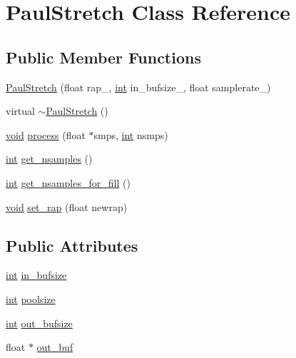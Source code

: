\hypertarget{class_paul_stretch}{}\section{Paul\+Stretch Class Reference}
\label{class_paul_stretch}
\subsection*{Public Member Functions}
\begin{DoxyCompactItemize}
\item 
\hyperlink{class_paul_stretch_ae065ed71ba3ac7cc4fd905939897fe18}{Paul\+Stretch} (float rap\+\_\+, \hyperlink{xmltok_8h_a5a0d4a5641ce434f1d23533f2b2e6653}{int} in\+\_\+bufsize\+\_\+, float samplerate\+\_\+)
\item 
virtual \hyperlink{class_paul_stretch_a4280ceeae933b6bc677da5c53ec4ada2}{$\sim$\+Paul\+Stretch} ()
\item 
\hyperlink{sound_8c_ae35f5844602719cf66324f4de2a658b3}{void} \hyperlink{class_paul_stretch_af2fb35d3f8bb2de5499a84b282a11d2a}{process} (float $\ast$smps, \hyperlink{xmltok_8h_a5a0d4a5641ce434f1d23533f2b2e6653}{int} nsmps)
\item 
\hyperlink{xmltok_8h_a5a0d4a5641ce434f1d23533f2b2e6653}{int} \hyperlink{class_paul_stretch_a37e7adacdd48ae49f9eb37d59a03d57a}{get\+\_\+nsamples} ()
\item 
\hyperlink{xmltok_8h_a5a0d4a5641ce434f1d23533f2b2e6653}{int} \hyperlink{class_paul_stretch_afbfe5780d9e8eb73904c2be2b7fd7adc}{get\+\_\+nsamples\+\_\+for\+\_\+fill} ()
\item 
\hyperlink{sound_8c_ae35f5844602719cf66324f4de2a658b3}{void} \hyperlink{class_paul_stretch_a3dbe9e2c057d0732f1a92616ec6ba2a7}{set\+\_\+rap} (float newrap)
\end{DoxyCompactItemize}
\subsection*{Public Attributes}
\begin{DoxyCompactItemize}
\item 
\hyperlink{xmltok_8h_a5a0d4a5641ce434f1d23533f2b2e6653}{int} \hyperlink{class_paul_stretch_a1764334c8682d1e033003632d1868b64}{in\+\_\+bufsize}
\item 
\hyperlink{xmltok_8h_a5a0d4a5641ce434f1d23533f2b2e6653}{int} \hyperlink{class_paul_stretch_ae18f59425914d1c4cf96ad9755e0d520}{poolsize}
\item 
\hyperlink{xmltok_8h_a5a0d4a5641ce434f1d23533f2b2e6653}{int} \hyperlink{class_paul_stretch_a56bb169123574b057c55024f7aae5d90}{out\+\_\+bufsize}
\item 
float $\ast$ \hyperlink{class_paul_stretch_a9a78c7f0ec886255b9b8c0eb3af0c22b}{out\+\_\+buf}
\end{DoxyCompactItemize}
